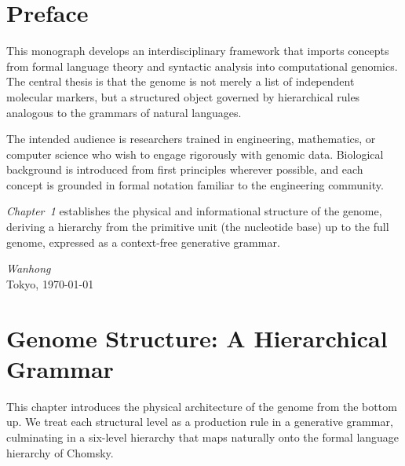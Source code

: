 \documentclass[12pt, a4paper, oneside]{book}
\theoremstyle{definition}
\theoremstyle{remark}
\begin{document}
\pagecolor{white}\color{black}

\frontmatter
\tableofcontents

\chapter*{Preface}

This monograph develops an interdisciplinary framework that imports concepts from
formal language theory and syntactic analysis into computational genomics.
The central thesis is that the genome is not merely a list of independent
molecular markers, but a structured object governed by hierarchical rules
analogous to the grammars of natural languages.

The intended audience is researchers trained in engineering, mathematics,
or computer science who wish to engage rigorously with genomic data.
Biological background is introduced from first principles wherever possible,
and each concept is grounded in formal notation familiar to the engineering
community.

\bigskip
\noindent
\textit{Chapter~1} establishes the physical and informational structure of
the genome, deriving a hierarchy from the primitive unit (the nucleotide
base) up to the full genome, expressed as a context-free generative grammar.

\vfill
\begin{flushright}
\textit{Wanhong}\\
Tokyo, \today
\end{flushright}

\mainmatter

\chapter{Genome Structure: A Hierarchical Grammar}
\label{chap:structure}

\begin{notebox}
This chapter introduces the physical architecture of the genome from the
bottom up.  We treat each structural level as a production rule in a
generative grammar, culminating in a six-level hierarchy that maps
naturally onto the formal language hierarchy of Chomsky.
\end{notebox}
\end{document}
